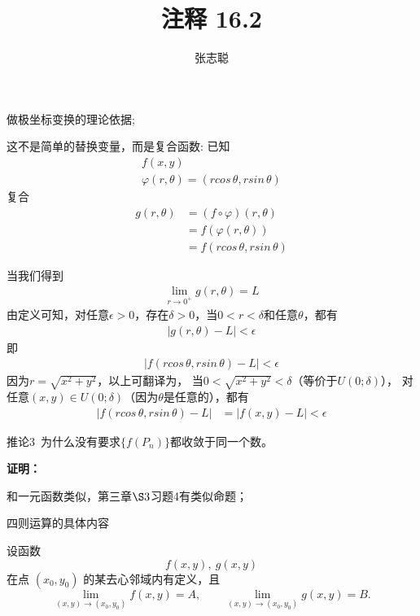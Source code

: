 \documentclass{article}
\begin{document}
\title{注释 16.2}
\author{张志聪}
\maketitle
\begin{zremark}
  做极坐标变换的理论依据;
\end{zremark}

这不是简单的替换变量，而是复合函数:
已知
\begin{align*}
  f(x, y) \\
  \varphi(r, \theta) = (rcos\, \theta, rsin\, \theta)
\end{align*}
复合
\begin{align*}
  g(r, \theta)
   & = (f \circ \varphi)(r, \theta)    \\
   & = f(\varphi(r, \theta))           \\
   & = f(rcos\, \theta, rsin\, \theta)
\end{align*}

当我们得到
\begin{align*}
  \lim\limits_{r \to 0^+} g(r, \theta) = L
\end{align*}
由定义可知，对任意$\epsilon > 0$，存在$\delta > 0$，当$0 < r < \delta$和任意$\theta$，都有
\begin{align*}
  |g(r, \theta) - L| < \epsilon
\end{align*}
即
\begin{align}
  |f(rcos\, \theta, rsin\, \theta) - L| < \epsilon
\end{align}
因为$r = \sqrt{x^2 + y^2}$，以上可翻译为，
当$0 < \sqrt{x^2 + y^2} < \delta$（等价于$U(0; \delta)$），
对任意$(x, y) \in U(0; \delta)$（因为$\theta$是任意的），都有
\begin{align*}
  |f(rcos\, \theta, rsin\, \theta) - L|
   & = |f(x, y) - L| < \epsilon
\end{align*}

\begin{zremark}
  推论3 $\, $为什么没有要求$\{f(P_n)\}$都收敛于同一个数。
\end{zremark}
\textbf{证明：}

和一元函数类似，第三章$\S 3$习题4有类似命题；

\begin{zremark}
  四则运算的具体内容
\end{zremark}
设函数
\[
  f(x,y),\ g(x,y)
\]
在点 $(x_0,y_0)$ 的某去心邻域内有定义，且
\[
  \lim_{(x,y)\to(x_0,y_0)} f(x,y)=A,\qquad
  \lim_{(x,y)\to(x_0,y_0)} g(x,y)=B.
\]
\end{document}
